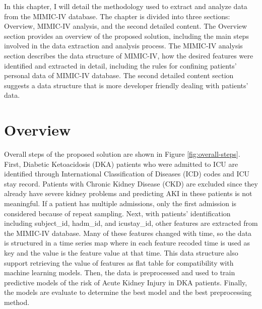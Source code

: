\documentclass[../main.tex]{subfiles}
\begin{document}
In this chapter, I will detail the methodology used to extract and analyze data from the MIMIC-IV database.
The chapter is divided into three sections: Overview, MIMIC-IV analysis, and the second detailed content.
The Overview section provides an overview of the proposed solution, including the main steps involved in the data extraction and analysis process.
The MIMIC-IV analysis section describes the data structure of MIMIC-IV, how the desired features were identified and  extracted in detail, including the rules for confining patients' personal data of MIMIC-IV database.
The second detailed content section suggests a data structure that is more developer friendly dealing with patients' data.


\section{Overview}

Overall steps of the proposed solution are shown in Figure \ref{fig:overall-steps}.
First, Diabetic Ketoacidosis (DKA) patients who were admitted to ICU are identified through International Classification of Diseases (ICD) codes and ICU stay record.
Patients with Chronic Kidney Disease (CKD) are excluded since they already have severe kidney problems and predicting AKI in these patients is not meaningful.
If a patient has multiple admissions, only the first admission is considered because of repeat sampling.
Next, with patients' identification including subject\_id, hadm\_id, and icustay\_id, other features are extracted from the MIMIC-IV database.
Many of these features changed with time, so the data is structured in a time series map where in each feature recoded time is used as key and the value is the feature value at that time.
This data structure also support retrieving the value of features as flat table for compatibility with machine learning models.
Then, the data is preprocessed and used to train predictive models of the risk of Acute Kidney Injury in DKA patients.
Finally, the models are evaluate to determine the best model and the best preprocessing method.
\end{document}
